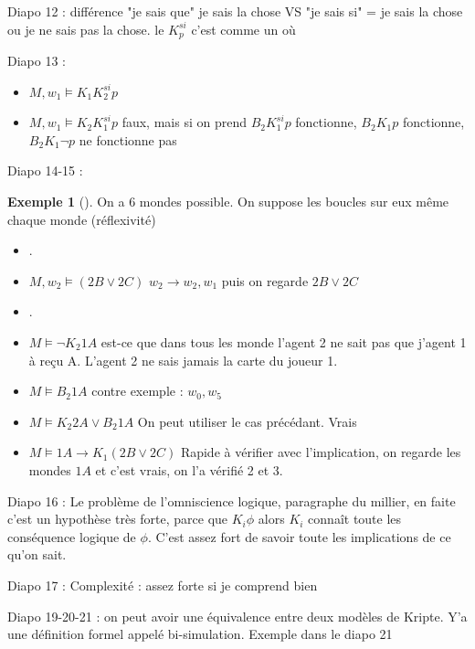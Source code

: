 \documentclass{article}
\theoremstyle{plain}%
\theoremstyle{definition}
\newtheorem{exmp}{Exemple}[section]
\theoremstyle{remark}
\begin{document}
Diapo 12 : différence "je sais que" je sais la chose VS "je sais si" = je sais la chose ou je ne sais pas la chose. le $ K_p^{si} $ c'est comme un où

Diapo 13 : 
\begin{itemize}
    \item $ M, w_1 \models K_1 K_2^{si}p $ 
    \item $ M, w_1 \models K_2 K_1^{si}p $ faux, mais si on prend $ B_2K_1^{si} p$ fonctionne, $ B_2K_1p$ fonctionne, $ B_2K_1\lnot p$ ne fonctionne pas
\end{itemize}

Diapo 14-15 : 
\begin{exmp}[]
    On a 6 mondes possible. On suppose les boucles sur eux même chaque monde (réflexivité)
    \begin{itemize}
        \item .
        \item $ M, w_2 \models (2B \vee 2C) $ $ w_2 \rightarrow w_2, w_1 $ puis on regarde $ 2B \vee 2C $ 
        \item .
        \item $ M \models \lnot K_2 1A $ est-ce que dans tous les monde l'agent 2 ne sait pas que j'agent 1 à reçu A. L'agent 2 ne sais jamais la carte du joueur 1. 
        \item $ M \models B_2 1A $ contre exemple : $ w_0, w_5 $ 
        \item $ M \models K_2 2A \vee B_2 1A $ On peut utiliser le cas précédant. Vrais
        \item $ M \models 1A \rightarrow K_1(2B \vee 2C) $ Rapide à vérifier avec l'implication, on regarde les mondes $ 1A $ et c'est vrais, on l'a vérifié 2 et 3.
    \end{itemize}
\end{exmp}

Diapo 16 : Le problème de l'omniscience logique, paragraphe du millier, en faite c'est un hypothèse très forte, parce que $ K_i \phi  $ alors $ K_i $ connaît toute les conséquence logique de $ \phi  $. C'est assez fort de savoir toute les implications de ce qu'on sait.

Diapo 17 : Complexité : assez forte si je comprend bien

Diapo 19-20-21 : on peut avoir une équivalence entre deux modèles de Kripte. Y'a une définition formel appelé bi-simulation. Exemple dans le diapo 21
\end{document}
